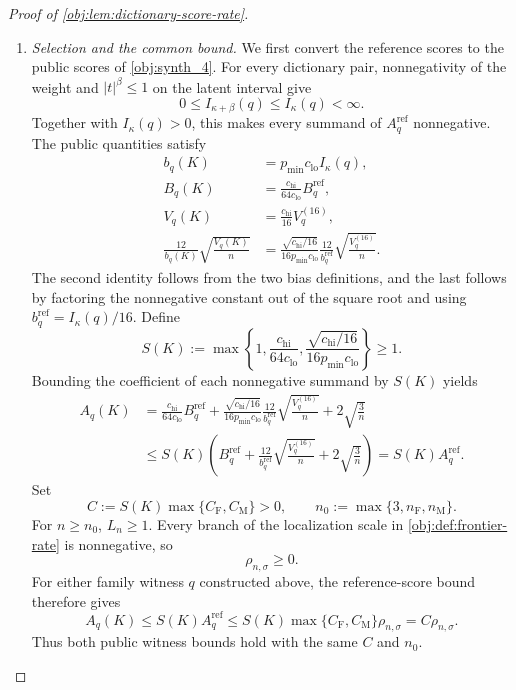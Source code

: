 \documentclass[11pt]{article}
\begin{document}
\begin{proof}[Proof of \cref{obj:lem:dictionary-score-rate}]
\begin{enumerate}
\item \emph{Selection and the common bound.}
We first convert the reference scores to the public scores of \cref{obj:synth_4}. For every dictionary pair, nonnegativity of the weight and \(|t|^\beta\le1\) on the latent interval give
\[
0\le I_{\kappa+\beta}(q)\le I_\kappa(q)<\infty.
\]
Together with \(I_\kappa(q)>0\), this makes every summand of \(A_q^{\mathrm{ref}}\) nonnegative. The public quantities satisfy
\[
\begin{aligned}
b_q(K)&=p_{\min}c_{\mathrm{lo}}I_\kappa(q),\\
B_q(K)&=\frac{c_{\mathrm{hi}}}{64c_{\mathrm{lo}}}B_q^{\mathrm{ref}},\\
V_q(K)&=\frac{c_{\mathrm{hi}}}{16}V_q^{(16)},\\
\frac{12}{b_q(K)}\sqrt{\frac{V_q(K)}n}
&=\frac{\sqrt{c_{\mathrm{hi}}/16}}{16p_{\min}c_{\mathrm{lo}}}
\frac{12}{b_q^{\mathrm{ref}}}\sqrt{\frac{V_q^{(16)}}n}.
\end{aligned}
\]
The second identity follows from the two bias definitions, and the last follows by factoring the nonnegative constant out of the square root and using \(b_q^{\mathrm{ref}}=I_\kappa(q)/16\). Define
\[
S(K):=\max\left\{1,\frac{c_{\mathrm{hi}}}{64c_{\mathrm{lo}}},
\frac{\sqrt{c_{\mathrm{hi}}/16}}{16p_{\min}c_{\mathrm{lo}}}\right\}\ge1.
\]
Bounding the coefficient of each nonnegative summand by \(S(K)\) yields
\[
\begin{aligned}
A_q(K)
&=\frac{c_{\mathrm{hi}}}{64c_{\mathrm{lo}}}B_q^{\mathrm{ref}}
+\frac{\sqrt{c_{\mathrm{hi}}/16}}{16p_{\min}c_{\mathrm{lo}}}
\frac{12}{b_q^{\mathrm{ref}}}\sqrt{\frac{V_q^{(16)}}n}
+2\sqrt{\frac3n}\\
&\le S(K)\left(B_q^{\mathrm{ref}}
+\frac{12}{b_q^{\mathrm{ref}}}\sqrt{\frac{V_q^{(16)}}n}
+2\sqrt{\frac3n}\right)
=S(K)A_q^{\mathrm{ref}}.
\end{aligned}
\]
Set
\[
C:=S(K)\max\{C_{\mathrm F},C_{\mathrm M}\}>0,
\qquad
n_0:=\max\{3,n_{\mathrm F},n_{\mathrm M}\}.
\]
For \(n\ge n_0\), \(L_n\ge1\). Every branch of the localization scale in \cref{obj:def:frontier-rate} is nonnegative, so
\[
\rho_{n,\sigma}\ge0.
\]
For either family witness \(q\) constructed above, the reference-score bound therefore gives
\[
A_q(K)\le S(K)A_q^{\mathrm{ref}}
\le S(K)\max\{C_{\mathrm F},C_{\mathrm M}\}\rho_{n,\sigma}
=C\rho_{n,\sigma}.
\]
Thus both public witness bounds hold with the same \(C\) and \(n_0\).


\end{enumerate}
\end{proof}
\end{document}
